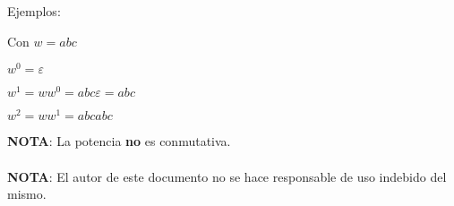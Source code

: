 \documentclass{article}
\begin{document}
Ejemplos:
\vspace{1em}

Con $w = abc$
\vspace{1em}

$w^0 = \varepsilon$

$w^1 = ww^0= abc \varepsilon = abc$

$w^2 = ww^1 = abcabc$
\vspace{1em}

\textbf{NOTA}: La potencia \textbf{no} es conmutativa.

\paragraph{}
\textbf{NOTA}: El autor de este documento no se hace responsable de uso indebido del
mismo.
\end{document}
